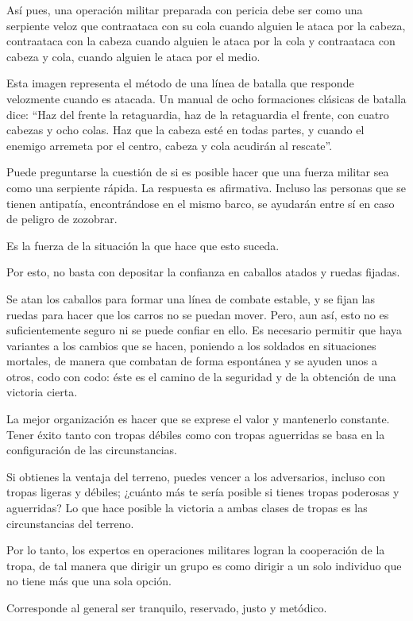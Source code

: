 Así pues, una operación militar preparada con pericia debe ser como una serpiente veloz que contraataca con su cola cuando alguien le ataca por la cabeza, contraataca con la cabeza cuando alguien le ataca por la cola y contraataca con cabeza y cola, cuando alguien le ataca por el medio.

Esta imagen representa el método de una línea de batalla que responde velozmente cuando es atacada. Un manual de ocho formaciones clásicas de batalla dice: ``Haz del frente la retaguardia, haz de la retaguardia el frente, con cuatro cabezas y ocho colas. Haz que la cabeza esté en todas partes, y cuando el enemigo arremeta por el centro, cabeza y cola acudirán al rescate''.

Puede preguntarse la cuestión de si es posible hacer que una fuerza militar sea como una serpiente rápida. La respuesta es afirmativa. Incluso las personas que se tienen antipatía, encontrándose en el mismo barco, se ayudarán entre sí en caso de peligro de zozobrar.

Es la fuerza de la situación la que hace que esto suceda.

Por esto, no basta con depositar la confianza en caballos atados y ruedas fijadas.

Se atan los caballos para formar una línea de combate estable, y se fijan las ruedas para hacer que los carros no se puedan mover. Pero, aun así, esto no es suficientemente seguro ni se puede confiar en ello. Es necesario permitir que haya variantes a los cambios que se hacen, poniendo a los soldados en situaciones mortales, de manera que combatan de forma espontánea y se ayuden unos a otros, codo con codo: éste es el camino de la seguridad y de la obtención de una victoria cierta.

La mejor organización es hacer que se exprese el valor y mantenerlo constante. Tener éxito tanto con tropas débiles como con tropas aguerridas se basa en la configuración de las circunstancias.

Si obtienes la ventaja del terreno, puedes vencer a los adversarios, incluso con tropas ligeras y débiles; ¿cuánto más te sería posible si tienes tropas poderosas y aguerridas? Lo que hace posible la victoria a ambas clases de tropas es las circunstancias del terreno.

Por lo tanto, los expertos en operaciones militares logran la cooperación de la tropa, de tal manera que dirigir un grupo es como dirigir a un solo individuo que no tiene más que una sola opción.

Corresponde al general ser tranquilo, reservado, justo y metódico.

